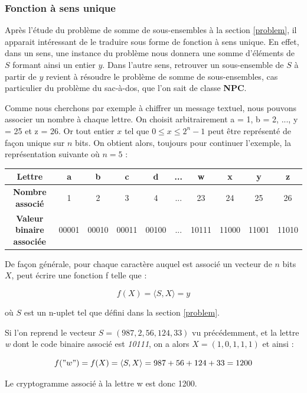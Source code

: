 \documentclass[a4paper,10pt]{article}
\begin{document}
\subsubsection{Fonction à sens unique}

Après l'étude du problème de somme de sous-ensembles à la section \ref{problem}, il apparait intéressant de le traduire sous forme de fonction à sens unique. En effet, dans un sens, une instance du problème nous donnera une somme d'éléments de $S$ formant ainsi un entier $y$. Dans l'autre sens, retrouver un sous-ensemble de $S$ à partir de $y$ revient à résoudre le problème de somme de sous-ensembles, cas particulier du problème du sac-à-dos, que l'on sait de classe \textbf{NPC}.

Comme nous cherchons par exemple à chiffrer un message textuel, nous pouvons associer un nombre à chaque lettre. On choisit arbitrairement a = 1, b = 2, ..., y = 25 et z = 26. Or tout entier $x$ tel que $ 0\leq x\leq 2^n-1$ peut être représenté de façon unique sur $n$ bits. On obtient alors, toujours pour continuer l'exemple, la représentation suivante où $n = 5$ :

\begin{center}
\begin{tabular}{|c|c|c|c|c|c|c|c|c|c|}
\hline
\textbf{Lettre} & a & b & c & d & ... & w & x & y & z\\
\hline
\textbf{Nombre associé} & 1 & 2 & 3 & 4 & ... & 23 & 24 & 25 & 26\\
\hline
\textbf{Valeur binaire associée} & 00001 & 00010 & 00011 & 00100 & ... & 10111 & 11000 & 11001 & 11010\\
\hline
\end{tabular}
\end{center}

De façon générale, pour chaque caractère auquel est associé un vecteur de $n$ bits $X$, peut écrire une fonction f telle que :

$$f(X) = \langle S , X\rangle = y$$ 

où $S$ est un n-uplet tel que défini dans la section \ref{problem}.

Si l'on reprend le vecteur $S = (987, 2, 56, 124, 33)$ vu précédemment, et la lettre \textit{w} dont le code binaire associé est \textit{10111}, on a alors $X = (1, 0, 1, 1, 1)$ et ainsi :

$$f("w") = f(X) = \langle S , X\rangle = 987 + 56 + 124 + 33 = 1200$$

Le cryptogramme associé à la lettre w est donc 1200.
\end{document}
